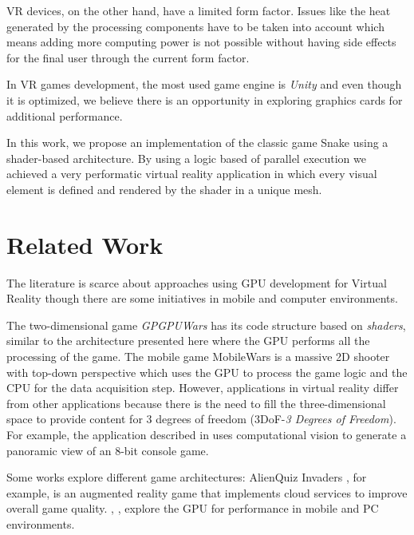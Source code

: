 \documentclass[runningheads]{llncs}
\begin{document}
VR devices, on the other hand, have a limited form factor. Issues like the heat generated by the processing components have to be taken into account which means adding more computing power is not possible without having side effects for the final user through the current form factor.

In VR games development, the most used game engine is \textit{Unity} and even though it is optimized, we believe there is an opportunity in exploring graphics cards for additional performance.

In this work, we propose an implementation of the classic game Snake using a shader-based architecture. By using a logic based of parallel execution we achieved a very performatic virtual reality application in which every visual element is defined and rendered by the shader in a unique mesh.




\section{Related Work}

The literature is scarce about approaches using GPU development for Virtual Reality though there are some initiatives in mobile and computer environments.


The two-dimensional game \textit{GPGPUWars} \cite{joselli2009gpuwars} has its code structure based on \textit{shaders}, similar to the architecture presented here where the GPU performs all the processing of the game. The mobile game MobileWars is a massive 2D shooter with top-down perspective \cite{MobileWars} which uses the GPU to process the game logic and the CPU for the data acquisition step. However, applications in virtual reality differ from other applications because there is the need to fill the three-dimensional space to provide content for 3 degrees of freedom (3DoF-\textit{3 Degrees of Freedom}). For example, the application described in \cite{zund2015unfolding} uses computational vision to generate a panoramic view of an 8-bit console game.

Some works explore different game architectures: AlienQuiz Invaders \cite{Loop2012}, for example, is an augmented reality game that implements cloud services to improve overall game quality. \cite{MobileWars}, \cite{joselli2009gpuwars}, \cite{GameArchitecture2009} explore the GPU for performance in mobile and PC environments.
\end{document}
